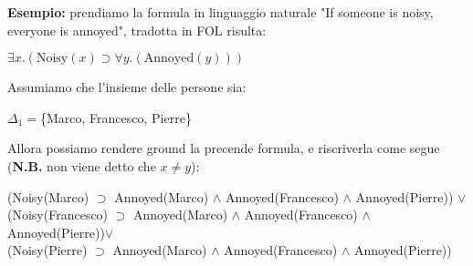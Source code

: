\documentclass[../main.tex]{subfiles}
\begin{document}
   \textbf{Esempio:}  prendiamo la formula in linguaggio naturale "If someone is noisy, everyone is annoyed", tradotta in FOL risulta:
   \begin{center}
      $\exists x.( \text{Noisy}(x) \supset \forall y.( \text{Annoyed}(y) ) )$
   \end{center}Assumiamo che l'insieme delle persone sia:
   \begin{center}
      $\Delta_1=$\{Marco, Francesco, Pierre\}
   \end{center}
   Allora possiamo rendere ground la precende formula, e riscriverla come segue (\textbf{N.B.} non viene detto che $x \neq y$):
   \begin{center}
      (Noisy(Marco) $\supset$ Annoyed(Marco) $\land$ Annoyed(Francesco) $\land$ Annoyed(Pierre)) $\lor$\\
      (Noisy(Francesco) $\supset$ Annoyed(Marco) $\land$ Annoyed(Francesco) $\land$ Annoyed(Pierre))$\lor$\\
      (Noisy(Pierre) $\supset$ Annoyed(Marco) $\land$ Annoyed(Francesco) $\land$ Annoyed(Pierre))
   \end{center}
\end{document}
